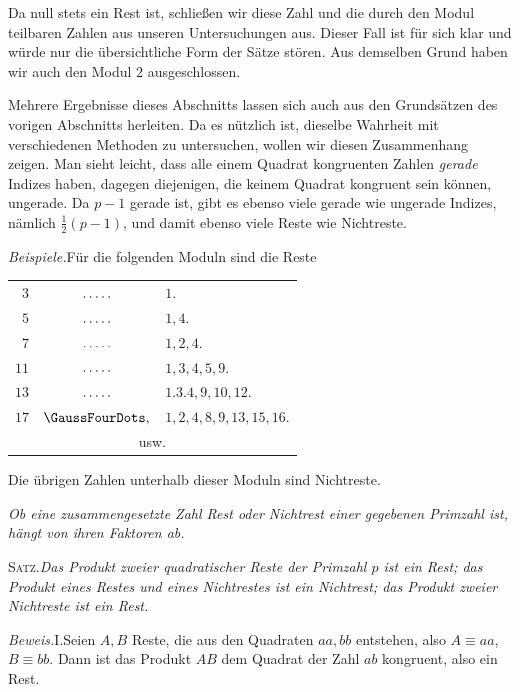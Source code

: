 Da null stets ein Rest ist, schließen wir diese Zahl und die durch den Modul teilbaren Zahlen aus unseren Untersuchungen aus. Dieser Fall ist für sich klar und würde nur die übersichtliche Form der Sätze stören. Aus demselben Grund haben wir auch den Modul $2$ ausgeschlossen.

Mehrere Ergebnisse dieses Abschnitts lassen sich auch aus den Grundsätzen des vorigen Abschnitts herleiten. Da es nützlich ist, dieselbe Wahrheit mit verschiedenen Methoden zu untersuchen, wollen wir diesen Zusammenhang zeigen. Man sieht leicht, dass alle einem Quadrat kongruenten Zahlen \emph{gerade} Indizes haben, dagegen diejenigen, die keinem Quadrat kongruent sein können, ungerade. Da $p-1$ gerade ist, gibt es ebenso viele gerade wie ungerade Indizes, nämlich $\tfrac12(p-1)$, und damit ebenso viele Reste wie Nichtreste.

\emph{Beispiele.}\quad Für die folgenden Moduln sind die Reste
\begin{center}
\begin{tabular}{@{}r@{\quad}c@{\quad}l@{}}
$3$ & $\mathinner{\ldotp\ldotp\ldotp\ldotp\ldotp}$ & $1.$\\
$5$ & $\mathinner{\ldotp\ldotp\ldotp\ldotp\ldotp}$ & $1,4.$\\
$7$ & $\mathinner{\ldotp\ldotp\ldotp\ldotp\ldotp}$ & $1,2,4.$\\
$11$ & $\mathinner{\ldotp\ldotp\ldotp\ldotp\ldotp}$ & $1,3,4,5,9.$\\
$13$ & $\mathinner{\ldotp\ldotp\ldotp\ldotp\ldotp}$ & $1.3.4,9,10,12.$\\
$17$ & $\GaussFourDots,$ & $1,2,4,8,9,13,15,16.$\\
\multicolumn{3}{c}{usw.}
\end{tabular}
\end{center}
Die übrigen Zahlen unterhalb dieser Moduln sind Nichtreste.

\begin{center}\small\emph{Ob eine zusammengesetzte Zahl Rest oder Nichtrest einer gegebenen Primzahl ist, hängt von ihren Faktoren ab.}\end{center}

\textsc{Satz.}\quad \emph{Das Produkt zweier quadratischer Reste der Primzahl $p$ ist ein Rest; das Produkt eines Restes und eines Nichtrestes ist ein Nichtrest; das Produkt zweier Nichtreste ist ein Rest.}

\emph{Beweis.}\quad I.\quad Seien $A,B$ Reste, die aus den Quadraten $aa,bb$ entstehen, also $A\equiv aa$, $B\equiv bb$. Dann ist das Produkt $AB$ dem Quadrat der Zahl $ab$ kongruent, also ein Rest.

